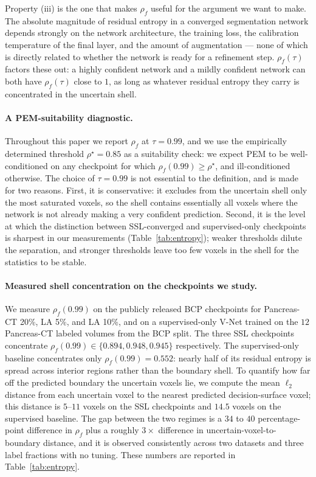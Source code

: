 Property (iii) is the one that makes $\rho_f$ useful for the argument we want to make. The absolute magnitude of residual entropy in a converged segmentation network depends strongly on the network architecture, the training loss, the calibration temperature of the final layer, and the amount of augmentation --- none of which is directly related to whether the network is ready for a refinement step. $\rho_f(\tau)$ factors these out: a highly confident network and a mildly confident network can both have $\rho_f(\tau)$ close to $1$, as long as whatever residual entropy they carry is concentrated in the uncertain shell.

\paragraph{A PEM-suitability diagnostic.} Throughout this paper we report $\rho_f$ at $\tau\!=\!0.99$, and we use the empirically determined threshold $\rho^\star\!=\!0.85$ as a suitability check: we expect PEM to be well-conditioned on any checkpoint for which $\rho_f(0.99) \ge \rho^\star$, and ill-conditioned otherwise. The choice of $\tau\!=\!0.99$ is not essential to the definition, and is made for two reasons. First, it is conservative: it excludes from the uncertain shell only the most saturated voxels, so the shell contains essentially all voxels where the network is not already making a very confident prediction. Second, it is the level at which the distinction between SSL-converged and supervised-only checkpoints is sharpest in our measurements (Table~\ref{tab:entropy}); weaker thresholds dilute the separation, and stronger thresholds leave too few voxels in the shell for the statistics to be stable.

\paragraph{Measured shell concentration on the checkpoints we study.} We measure $\rho_f(0.99)$ on the publicly released BCP checkpoints for Pancreas-CT 20\%, LA 5\%, and LA 10\%, and on a supervised-only V-Net trained on the $12$ Pancreas-CT labeled volumes from the BCP split. The three SSL checkpoints concentrate $\rho_f(0.99)\!\in\!\{0.894, 0.948, 0.945\}$ respectively. The supervised-only baseline concentrates only $\rho_f(0.99)\!=\!0.552$: nearly half of its residual entropy is spread across interior regions rather than the boundary shell. To quantify how far off the predicted boundary the uncertain voxels lie, we compute the mean $\ell_2$ distance from each uncertain voxel to the nearest predicted decision-surface voxel; this distance is $5$--$11$ voxels on the SSL checkpoints and $14.5$ voxels on the supervised baseline. The gap between the two regimes is a $34$ to $40$ percentage-point difference in $\rho_f$ plus a roughly $3\times$ difference in uncertain-voxel-to-boundary distance, and it is observed consistently across two datasets and three label fractions with no tuning. These numbers are reported in Table~\ref{tab:entropy}.

